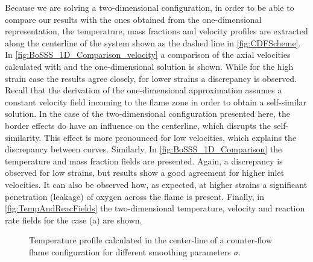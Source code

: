 Because we are solving a two-dimensional configuration, in order to be able to compare our results with the ones obtained from the one-dimensional representation, the temperature, mass fractions and velocity profiles are extracted along the centerline of the system shown as the dashed line in \cref{fig:CDFScheme}. In \cref{fig:BoSSS_1D_Comparison_velocity} a comparison of the axial velocities calculated with \BoSSS and the one-dimensional solution is shown. While for the high strain case the results agree closely, for lower strains a discrepancy is observed. Recall that the derivation of the one-dimensional approximation assumes a constant velocity field incoming to the flame zone in order to obtain a self-similar solution. In the case of the two-dimensional configuration presented here, the border effects do have an influence on the centerline, which disrupts the self-similarity. This effect is more pronounced for low velocities, which explains the discrepancy between curves. Similarly, In \cref{fig:BoSSS_1D_Comparison} the temperature and mass fraction fields are presented. Again, a discrepancy is observed for low strains, but results show a good agreement for higher inlet velocities. It can also be observed how, as expected, \cite{fernandez-tarrazoSimpleOnestepChemistry2006} at higher strains a significant penetration (leakage) of oxygen across the flame is present. Finally, in \cref{fig:TempAndReacFields} the two-dimensional temperature, velocity and reaction rate fields for the case (a) are shown.
\begin{figure}
	\centering
	\caption{Temperature profile calculated in the center-line of a counter-flow flame configuration for different smoothing parameters $\sigma$.}
	\label{fig:smoothings}
\end{figure}

